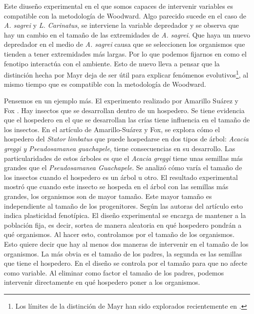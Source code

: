 Este diuseño experimental en el que somos capaces de intervenir variables es compatible con la metodología de Woodward. Algo parecido sucede en el caso de \emph{A. sagrei} y \emph{L. Carinatus}, se interviene la variable depredador y se observa que hay un cambio en el tamaño de las extremidades de \emph{A. sagrei}. Que haya un nuevo depredador en el medio de \emph{A. sagrei} causa que se seleccionen los organismos que tienden a tener extremidades más largas. Por lo que podemos fijarnos en como el fenotipo interactúa con el ambiente. Esto de nuevo lleva a pensar que la distinción hecha por Mayr deja de ser útil para explicar fenómenos evolutivos\footnote{Los límites de la distinción de Mayr han sido explorados recientemente en \cite{Uller2020, Dayan2020, Laland2011}.}, al mismo tiempo que es compatible con la metodología de Woodward.

Pensemos en un ejemplo más. El experimento realizado por Amarillo Suárez y Fox \citeyear{Amarillo-Suarez2006}. Hay insectos que se desarrollan dentro de un hospedero. Se tiene evidencia que el hospedero en el que se desarrollan las crías tiene influencia en el tamaño de los insectos. En el artículo de Amarillo-Suárez y Fox, se explora cómo el hospedero del \emph{Stator limbatus} que puede hospedarse en dos tipos de árbol: \emph{Acacia greggi y Pseudosamanea guachapele}, tiene consecuencias en su desarrollo. Las particularidades de estos árboles es que el \emph{Acacia greggi} tiene unas semillas más grandes que el \emph{Pseudosamanea Guachapele}. Se analizó cómo varía el tamaño de los insectos cuando el hospedero es un árbol u otro. El resultado experimental mostró que cuando este insecto se hospeda en el árbol con las semillas más grandes, los organismos son de mayor tamaño. Este mayor tamaño es independiente al tamaño de los progenitores. Según las autoras del artículo esto indica plasticidad fenotípica. El diseño experimental se encarga de mantener a la población fija, es decir, sortea de manera aleatoria en qué hospedero pondrán a qué organismos. Al hacer esto, controlamos por el tamaño de los organismos. Esto quiere decir que hay al menos dos maneras de intervenir en el tamaño de los organismos. La más obvia es el tamaño de los padres, la segunda es las semillas que tiene el hospedero. En el diseño se controla por el tamaño para que no afecte como variable. Al eliminar como factor el tamaño de los padres, podemos intervenir directamente en qué hospedero poner a los organismos.

\begin{center}
\end{center}


